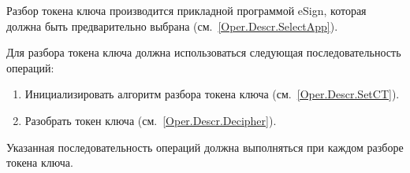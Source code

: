 Разбор токена ключа производится прикладной программой eSign, которая
должна быть предварительно выбрана (см.~\ref{Oper.Descr.SelectApp}).

Для разбора токена ключа должна использоваться 
следующая последовательность операций:
%
\begin{enumerate}
\item Инициализировать алгоритм разбора токена ключа (см.~\ref{Oper.Descr.SetCT}).
\item Разобрать токен ключа (см.~\ref{Oper.Descr.Decipher}).
\end{enumerate}
%
Указанная последовательность операций должна выполняться
при каждом разборе токена ключа.
